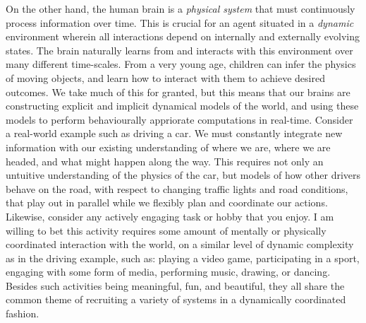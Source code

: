 On the other hand, the human brain is a {\it physical system} that must continuously process information over time.
This is crucial for an agent situated in a {\it dynamic} environment wherein all interactions depend on internally and externally evolving states.
The brain naturally learns from and interacts with this environment over many different time-scales. 
From a very young age, children can infer the physics of moving objects, and learn how to interact with them to achieve desired outcomes.
We take much of this for granted, but this means that our brains are constructing explicit and implicit dynamical models of the world, and using these models
to perform behaviourally appriorate computations in real-time.
Consider a real-world example such as driving a car. We must constantly integrate new information with our existing understanding of where we are, where we are headed, and what might happen along the way.
This requires not only an untuitive understanding of the physics of the car, but models of how other drivers behave on the road, with respect to changing traffic lights and road conditions, that play out in parallel while we flexibly plan and coordinate our actions.
Likewise, consider any actively engaging task or hobby that you enjoy. I am willing to bet this activity requires some amount of mentally or physically coordinated interaction with the world, on a similar level of dynamic complexity as in the driving example, such as: playing a video game, participating in a sport, engaging with some form of media, performing music, drawing, or dancing.
Besides such activities being meaningful, fun, and beautiful, they all share the common theme of recruiting a variety of systems in a dynamically coordinated fashion.

